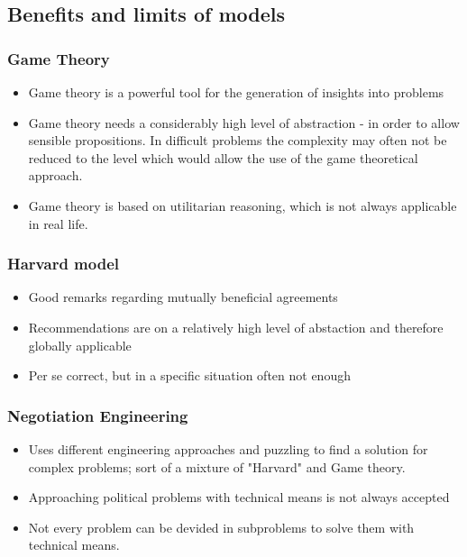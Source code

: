 \subsection{Benefits and limits of models}

\subsubsection{Game Theory}

\begin{itemize}
    \item Game theory is a powerful tool for the generation of insights into
        problems
    \item Game theory needs a considerably high level of abstraction - in order
        to allow sensible propositions. In difficult problems the complexity
        may often not be reduced to the level which would allow the use of the
        game theoretical approach.
    \item Game theory is based on utilitarian reasoning, which is not always
        applicable in real life.
\end{itemize}

\subsubsection{Harvard model}

\begin{itemize}
    \item Good remarks regarding mutually beneficial agreements
    \item Recommendations are on a relatively high level of abstaction and
        therefore globally applicable
    \item Per se correct, but in a specific situation often not enough
\end{itemize}

\subsubsection{Negotiation Engineering}

\begin{itemize}
    \item Uses different engineering approaches and puzzling to find a solution
        for complex problems; sort of a mixture of "Harvard" and Game theory.
    \item Approaching political problems with technical means is not always accepted
    \item Not every problem can be devided in subproblems to solve them with technical
        means.
\end{itemize}

